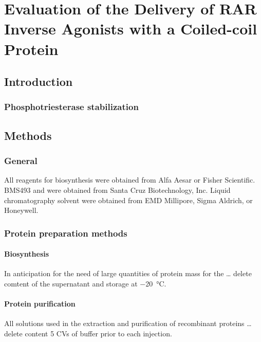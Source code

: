 \chapter{Evaluation of the Delivery of RAR Inverse Agonists with a Coiled-coil
Protein}
\label{chap:dimer}
\begin{refsection}

\section{Introduction}

\subsection{Phosphotriesterase stabilization}

\section{Methods}

\subsection{General}

All reagents for biosynthesis were obtained from Alfa Aesar or Fisher
Scientific. BMS493 and  were obtained from Santa
Cruz Biotechnology, Inc. Liquid chromatography solvent were obtained from EMD
Millipore, Sigma Aldrich, or Honeywell.

\subsection{Protein preparation methods}

\subsubsection{Biosynthesis}

In anticipation for the need of large quantities of protein mass for the \ldots
delete comtent of the supernatant and storage at \SI{-20}{\celsius}.

\subsubsection{Protein purification}
All solutions used in the extraction and purification of recombinant proteins
\ldots delete content 5 CVs of buffer prior to each injection.


\end{refsection}

